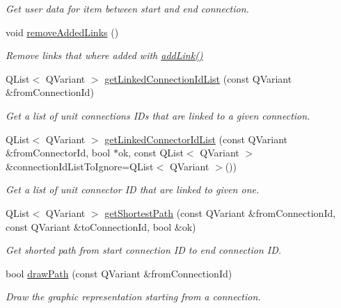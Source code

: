 \begin{DoxyCompactItemize}
\begin{DoxyCompactList}\small\item\em Get user data for item between start and end connection. \end{DoxyCompactList}\item 
void \hyperlink{classmdt_cl_path_graph_a5bee589e7c93681bf9325fd9bc999eb9}{remove\-Added\-Links} ()
\begin{DoxyCompactList}\small\item\em Remove links that where added with \hyperlink{classmdt_cl_path_graph_a14a5580402b273eb6707939ee122fa95}{add\-Link()} \end{DoxyCompactList}\item 
Q\-List$<$ Q\-Variant $>$ \hyperlink{classmdt_cl_path_graph_a09b3b342fe09d1afdbc88c8c683ab016}{get\-Linked\-Connection\-Id\-List} (const Q\-Variant \&from\-Connection\-Id)
\begin{DoxyCompactList}\small\item\em Get a list of unit connections I\-Ds that are linked to a given connection. \end{DoxyCompactList}\item 
Q\-List$<$ Q\-Variant $>$ \hyperlink{classmdt_cl_path_graph_af5484b6efa4b9d9162de3dd1834fcb41}{get\-Linked\-Connector\-Id\-List} (const Q\-Variant \&from\-Connector\-Id, bool $\ast$ok, const Q\-List$<$ Q\-Variant $>$ \&connection\-Id\-List\-To\-Ignore=Q\-List$<$ Q\-Variant $>$())
\begin{DoxyCompactList}\small\item\em Get a list of unit connector I\-D that are linked to given one. \end{DoxyCompactList}\item 
Q\-List$<$ Q\-Variant $>$ \hyperlink{classmdt_cl_path_graph_afa0a3c6b9fd56cfd943a3bc2480c1ce0}{get\-Shortest\-Path} (const Q\-Variant \&from\-Connection\-Id, const Q\-Variant \&to\-Connection\-Id, bool \&ok)
\begin{DoxyCompactList}\small\item\em Get shorted path from start connection I\-D to end connection I\-D. \end{DoxyCompactList}\item 
bool \hyperlink{classmdt_cl_path_graph_ae779d0527cc984122dbf063238b59749}{draw\-Path} (const Q\-Variant \&from\-Connection\-Id)
\begin{DoxyCompactList}\small\item\em Draw the graphic representation starting from a connection. \end{DoxyCompactList}\item 

\end{DoxyCompactItemize}
